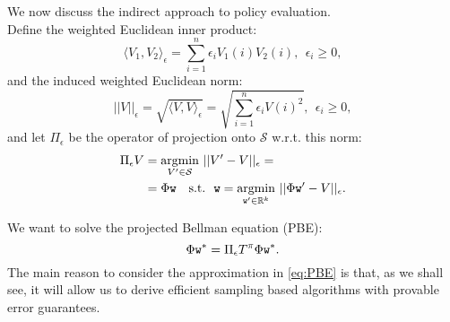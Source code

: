 We now discuss the indirect approach to policy evaluation.
\\
Define the weighted Euclidean inner product:
$$\langle V_1,V_2\rangle_\epsilon = {\sum_{i=1}^n \epsilon_i V_1(i)V_2(i)}, \ \ \epsilon_i\ge0,$$
and the induced weighted Euclidean norm:
$$||V||_\epsilon = \sqrt{\langle V,V\rangle_\epsilon} = \sqrt{\sum_{i=1}^n \epsilon_i V(i)^2}, \ \ \epsilon_i\ge0,$$
and let $\Pi_\epsilon$ be the operator of projection onto $\mathcal{S}$ w.r.t. this norm:
\begin{align*}\Pi_\epsilon V &=\underset{V' \in \mathcal{S}}{\operatorname{argmin}} \ ||V'-V||_\epsilon =\\
&= \Phi \texttt{w} \ \ \ \mathrm{s.t.} \ \ \texttt{w} = \underset{\texttt{w}' \in \mathbb{R}^k}{\operatorname{argmin}} \ ||\Phi \texttt{w}' - V||_\epsilon.\end{align*}

We want to solve the projected Bellman equation (PBE):
\begin{equation}\label{eq:PBE}
\Phi \texttt{w}^*  = \Pi_\epsilon T^\pi \Phi \texttt{w}^*.
\end{equation}
The main reason to consider the approximation in \eqref{eq:PBE} is that, as we shall see, it will allow us to derive efficient sampling based algorithms with provable error guarantees.


